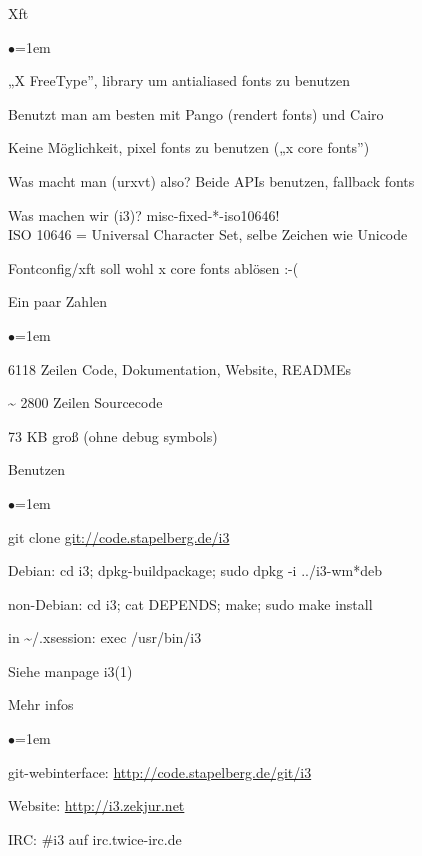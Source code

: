 \documentclass[mode=print,paper=screen,style=jefka]{powerdot}
\begin{document}
\begin{slide}{Xft}
\begin{list}{$\bullet$}{\itemsep=1em}
	\item<1-> „X FreeType”, library um antialiased fonts zu benutzen
	\item<2-> Benutzt man am besten mit Pango (rendert fonts) und Cairo
	\item<3-> Keine Möglichkeit, pixel fonts zu benutzen („x core fonts”)
	\item<4-> Was macht man (urxvt) also? Beide APIs benutzen, fallback fonts
	\item<5-> Was machen wir (i3)? misc-fixed-*-iso10646!\\
		ISO 10646 = Universal Character Set, selbe Zeichen wie Unicode
	\item<6-> Fontconfig/xft soll wohl x core fonts ablösen :-(
\end{list}
\end{slide}

\begin{slide}{Ein paar Zahlen}
\begin{list}{$\bullet$}{\itemsep=1em}
	\item<1-> 6118 Zeilen Code, Dokumentation, Website, READMEs
	\item<2-> \~{} 2800 Zeilen Sourcecode
	\item<3-> 73 KB groß (ohne debug symbols)
\end{list}
\end{slide}

\begin{slide}{Benutzen}
\begin{list}{$\bullet$}{\itemsep=1em}
	\item git clone \url{git://code.stapelberg.de/i3}
	\item Debian: cd i3; dpkg-buildpackage; sudo dpkg -i ../i3-wm*deb
	\item non-Debian: cd i3; cat DEPENDS; make; sudo make install
	\item in \~{}/.xsession: exec /usr/bin/i3
	\item Siehe manpage i3(1)
\end{list}
\end{slide}

\begin{slide}{Mehr infos}
\begin{list}{$\bullet$}{\itemsep=1em}
	\item git-webinterface: \url{http://code.stapelberg.de/git/i3}
	\item Website: \url{http://i3.zekjur.net}
	\item IRC: \#i3 auf irc.twice-irc.de
\end{list}
\end{slide}
\end{document}
